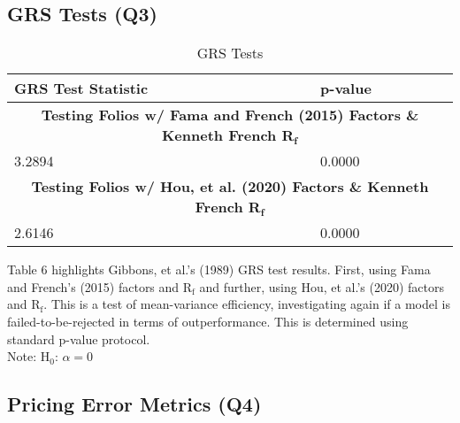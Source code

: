 \documentclass[11pt, english]{article}
\begin{document}
	\subsection{GRS Tests (Q3)}

\begin{table}[h]
	\scriptsize
	\renewcommand{\arraystretch}{1.25}
\begin{center}
\begin{tabular}{ p{5cm} p{5cm} }
        \textbf{GRS Test Statistic} & \textbf{p-value}\\
        \hline
        \multicolumn{2}{c}{\textbf{Testing Folios w/ Fama and French (2015) Factors \& Kenneth French R$\mathbf{_f}$}}\\
        \hline
        3.2894 & 0.0000\\
        \hline
        \multicolumn{2}{c}{\textbf{Testing Folios w/ Hou, et al. (2020) Factors \& Kenneth French R$\mathbf{_f}$}}\\
        \hline
        2.6146 & 0.0000\\
        \hline
\end{tabular}
        \caption{GRS Tests}
\end{center}
\end{table}

Table 6 highlights Gibbons, et al.'s (1989) GRS test results. First, using Fama and French's (2015) factors and R$\mathrm{_f}$ and further, using Hou, et al.'s (2020) factors and R$\mathrm{_f}$. This is a test of mean-variance efficiency, investigating again if a model is failed-to-be-rejected in terms of outperformance. This is determined using standard p-value protocol.\\

Note: $\mathrm{H_0}$: $\alpha=0$

\newpage

	\subsection{Pricing Error Metrics (Q4)}
\end{document}
